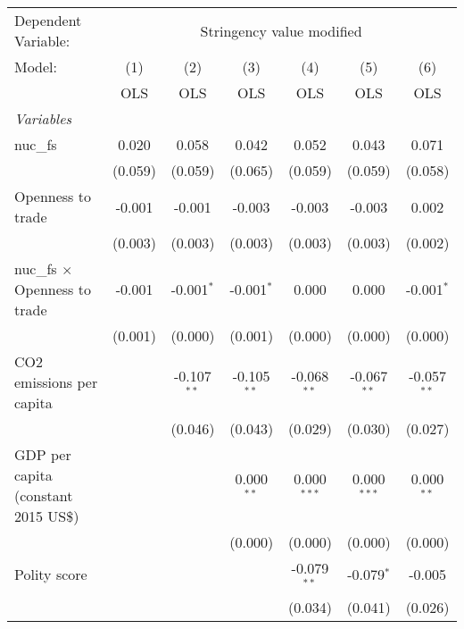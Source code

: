 
\begingroup
\centering
\begin{tabular}{lcccccc}
   \toprule
   Dependent Variable: & \multicolumn{6}{c}{Stringency value modified}\\
   Model:                               & (1)     & (2)           & (3)           & (4)           & (5)           & (6)\\  
                                        &  OLS    & OLS           & OLS           & OLS           & OLS           & OLS\\  
   \midrule
   \emph{Variables}\\
   nuc\_fs                              & 0.020   & 0.058         & 0.042         & 0.052         & 0.043         & 0.071\\   
                                        & (0.059) & (0.059)       & (0.065)       & (0.059)       & (0.059)       & (0.058)\\   
   Openness to trade                    & -0.001  & -0.001        & -0.003        & -0.003        & -0.003        & 0.002\\   
                                        & (0.003) & (0.003)       & (0.003)       & (0.003)       & (0.003)       & (0.002)\\   
   nuc\_fs $\times$ Openness to trade   & -0.001  & -0.001$^{*}$  & -0.001$^{*}$  & 0.000         & 0.000         & -0.001$^{*}$\\   
                                        & (0.001) & (0.000)       & (0.001)       & (0.000)       & (0.000)       & (0.000)\\   
   CO2 emissions per capita             &         & -0.107$^{**}$ & -0.105$^{**}$ & -0.068$^{**}$ & -0.067$^{**}$ & -0.057$^{**}$\\   
                                        &         & (0.046)       & (0.043)       & (0.029)       & (0.030)       & (0.027)\\   
   GDP per capita (constant 2015 US\$)  &         &               & 0.000$^{**}$  & 0.000$^{***}$ & 0.000$^{***}$ & 0.000$^{**}$\\   
                                        &         &               & (0.000)       & (0.000)       & (0.000)       & (0.000)\\   
   Polity score                         &         &               &               & -0.079$^{**}$ & -0.079$^{*}$  & -0.005\\   
                                        &         &               &               & (0.034)       & (0.041)       & (0.026)\\   

\end{tabular}
